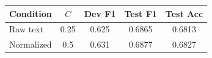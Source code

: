 \begin{tabular}{lcccc}
\toprule
Condition & $C$ & Dev F1 & Test F1 & Test Acc\\
\midrule
Raw text & 0.25 & 0.625 & 0.6865 & 0.6813\\
Normalized & 0.5 & 0.631 & 0.6877 & 0.6827\\
\bottomrule
\end{tabular}
